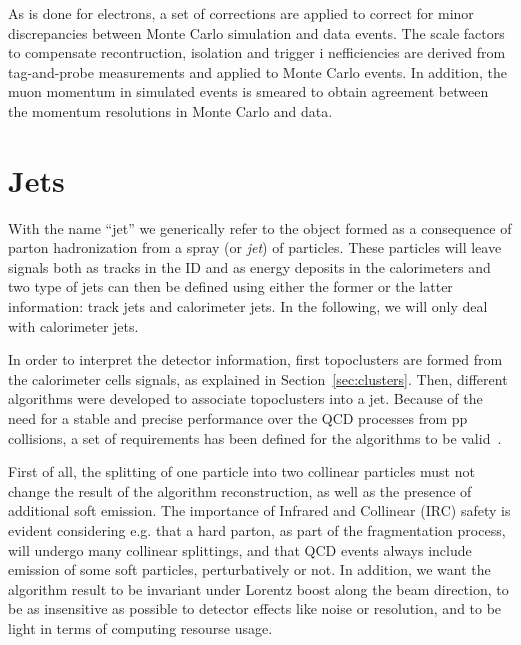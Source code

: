 As is done for electrons, a set of corrections are applied to correct for minor
discrepancies between Monte Carlo simulation and data events.
The scale factors to compensate recontruction, isolation and trigger i
nefficiencies are derived from tag-and-probe measurements
and applied to Monte Carlo events. In addition, the muon momentum
in simulated events is smeared to obtain agreement between the momentum
resolutions in Monte Carlo and data.


\section{Jets}\label{sec:jets}

With the name ``jet'' we generically refer to the object formed as a consequence
of parton hadronization from a spray (or {\it jet}) of particles. These particles
will leave signals both as tracks in the ID and as energy deposits in the calorimeters
and two type of jets can then be defined using either the former or the latter information:
track jets and calorimeter jets. In the following, we will only deal with calorimeter jets.

In order to interpret the detector information, first topoclusters are formed from the
calorimeter cells signals, as explained in Section~\ref{sec:clusters}. Then, different
algorithms were developed to associate topoclusters into a jet. Because of the
need for a stable and precise performance over the QCD processes from pp collisions,
a set of requirements has been defined for the algorithms to be valid~\cite{Salam:2009jx}.

First of all, the splitting of one particle into two collinear particles must not change the 
result of the algorithm reconstruction, as well as the presence of additional soft emission.
The importance of Infrared and Collinear (IRC) safety is evident considering e.g. 
that a hard parton, as part of the fragmentation process, will undergo many collinear splittings,
and that QCD events always include emission of some soft particles, perturbatively or not.
In addition, we want the algorithm result to be invariant under Lorentz boost along the beam direction,
to be as insensitive as possible to detector effects like noise or resolution, and to be light in terms
of computing resourse usage.

